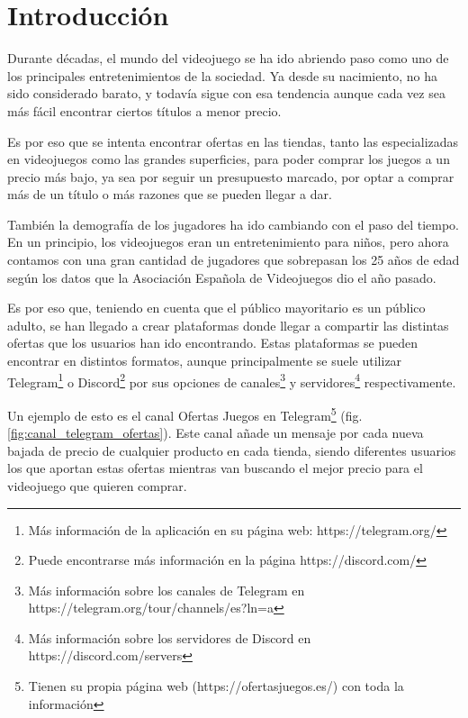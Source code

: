 \chapter{Introducción}

Durante décadas, el mundo del videojuego se ha ido abriendo paso como uno de los principales entretenimientos de la sociedad. Ya desde su nacimiento, 
no ha sido considerado barato, y todavía sigue con esa tendencia aunque cada vez sea más fácil encontrar ciertos títulos a menor precio.

Es por eso que se intenta encontrar ofertas en las tiendas, tanto las especializadas en videojuegos como las grandes superficies, para poder comprar 
los juegos a un precio más bajo, ya sea por seguir un presupuesto marcado, por optar a comprar más de un título o más razones que se pueden llegar a 
dar.

También la demografía de los jugadores ha ido cambiando con el paso del tiempo. En un principio, los videojuegos eran un entretenimiento para niños, pero 
ahora contamos con una gran cantidad de jugadores que sobrepasan los 25 años de edad según los datos que la Asociación Española de Videojuegos\cite{aevi} 
dio el año pasado.

Es por eso que, teniendo en cuenta que el público mayoritario es un público adulto, se han llegado a crear plataformas donde llegar a compartir las 
distintas ofertas que los usuarios han ido encontrando. Estas plataformas se pueden encontrar en distintos formatos, aunque principalmente se suele 
utilizar Telegram\footnote{Más información de la aplicación en su página web: https://telegram.org/} o Discord\footnote{Puede encontrarse más información 
en la página https://discord.com/} por sus opciones de canales\footnote{Más información sobre los canales de Telegram en 
https://telegram.org/tour/channels/es?ln=a} y servidores\footnote{Más información sobre los servidores de Discord en https://discord.com/servers} 
respectivamente.

Un ejemplo de esto es el canal Ofertas Juegos en Telegram\footnote{Tienen su propia página web (https://ofertasjuegos.es/) con toda la información} 
(fig. \ref{fig:canal_telegram_ofertas}). Este canal añade un mensaje por cada nueva bajada de precio de cualquier producto en cada tienda, siendo 
diferentes usuarios los que aportan estas ofertas mientras van buscando el mejor precio para el videojuego que quieren comprar.

